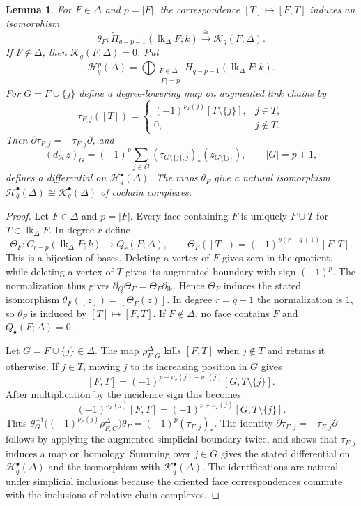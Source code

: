 \documentclass[11pt]{article}
\theoremstyle{plain}
\newtheorem{lemma}[theorem]{Lemma}
\theoremstyle{definition}
\newcommand{\kk}{k}
\newcommand{\link}{\operatorname{lk}}
\newcommand{\rH}{\widetilde{H}}
\newcommand{\rC}{\widetilde{C}}
\newcommand{\Kc}{\mathcal K}
\begin{document}
\begin{lemma}\label{lem:costar-link}
For $F\in\Delta$ and $p=|F|$, the correspondence $[T]\mapsto[F,T]$ induces an isomorphism
\[
\theta_F:\rH_{q-p-1}(\link_\Delta F;\kk)\xrightarrow{\ \cong\ }\Kc_q(F;\Delta).
\]
If $F\notin\Delta$, then $\Kc_q(F;\Delta)=0$. Put
\[
\mathcal H_q^p(\Delta)=\bigoplus_{\substack{F\in\Delta\\|F|=p}}\rH_{q-p-1}(\link_\Delta F;\kk).
\]
For $G=F\cup\{j\}$ define a degree-lowering map on augmented link chains by
\[
\tau_{F,j}([T])=\begin{cases}(-1)^{\nu_T(j)}[T\setminus\{j\}],&j\in T,\\0,&j\notin T.\end{cases}
\]
Then $\partial\tau_{F,j}=-\tau_{F,j}\partial$, and
\[
(d_{\mathcal H}z)_G=(-1)^p\sum_{j\in G}(\tau_{G\setminus\{j\},j})_*(z_{G\setminus\{j\}}),\qquad |G|=p+1,
\]
defines a differential on $\mathcal H_q^\bullet(\Delta)$. The maps $\theta_F$ give a natural isomorphism $\mathcal H_q^\bullet(\Delta)\cong\Kc_q^\bullet(\Delta)$ of cochain complexes.
\end{lemma}

\begin{proof}
Let $F\in\Delta$ and $p=|F|$. Every face containing $F$ is uniquely $F\cup T$ for $T\in\link_\Delta F$. In degree $r$ define
\[
\Theta_F:\rC_{r-p}(\link_\Delta F;\kk)\longrightarrow Q_r(F;\Delta),\qquad
\Theta_F([T])=(-1)^{p(r-q+1)}[F,T].
\]
This is a bijection of bases. Deleting a vertex of $F$ gives zero in the quotient, while deleting a vertex of $T$ gives its augmented boundary with sign $(-1)^p$. The normalization thus gives $\partial_Q\Theta_F=\Theta_F\partial_{\link}$. Hence $\Theta_F$ induces the stated isomorphism $\theta_F([z])=[\Theta_F(z)]$. In degree $r=q-1$ the normalization is $1$, so $\theta_F$ is induced by $[T]\mapsto[F,T]$. If $F\notin\Delta$, no face contains $F$ and $Q_\bullet(F;\Delta)=0$.

Let $G=F\cup\{j\}\in\Delta$. The map $\rho^\Delta_{F,G}$ kills $[F,T]$ when $j\notin T$ and retains it otherwise. If $j\in T$, moving $j$ to its increasing position in $G$ gives
\[
[F,T]=(-1)^{p-\nu_F(j)+\nu_T(j)}[G,T\setminus\{j\}].
\]
After multiplication by the incidence sign this becomes
\[
(-1)^{\nu_F(j)}[F,T]=(-1)^{p+\nu_T(j)}[G,T\setminus\{j\}].
\]
Thus $\theta_G^{-1}\bigl((-1)^{\nu_F(j)}\rho^\Delta_{F,G}\bigr)\theta_F=(-1)^p(\tau_{F,j})_*$. The identity $\partial\tau_{F,j}=-\tau_{F,j}\partial$ follows by applying the augmented simplicial boundary twice, and shows that $\tau_{F,j}$ induces a map on homology. Summing over $j\in G$ gives the stated differential on $\mathcal H_q^\bullet(\Delta)$ and the isomorphism with $\Kc_q^\bullet(\Delta)$. The identifications are natural under simplicial inclusions because the oriented face correspondences commute with the inclusions of relative chain complexes.
\end{proof}
\end{document}
